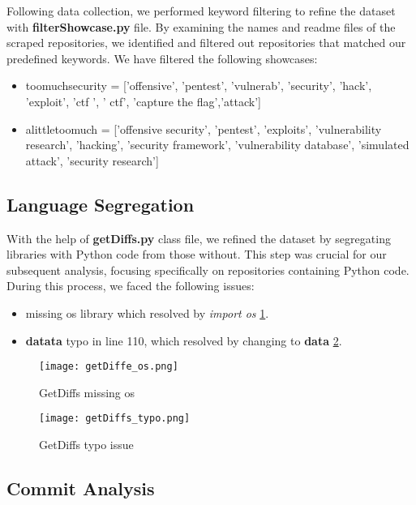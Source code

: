 Following data collection, we performed keyword filtering to refine the dataset with \textbf{filterShowcase.py} file. 
By examining the names and readme files of the scraped repositories, we identified and filtered out repositories that matched our predefined keywords.
We have filtered the following showcases:
\begin{itemize}
    \item toomuchsecurity = ['offensive', 'pentest', 'vulnerab', 'security', 'hack', 'exploit', 'ctf ', ' ctf', 'capture the flag','attack'] 
    \item alittletoomuch = ['offensive security', 'pentest', 'exploits', 'vulnerability research', 'hacking', 'security framework', 'vulnerability database', 'simulated attack', 'security research'] 
    \end{itemize}

\subsection{Language Segregation}

With the help of \textbf{getDiffs.py} class file, we refined the dataset by segregating libraries with Python code from those without. 
This step was crucial for our subsequent analysis, focusing specifically on repositories containing Python code.
During this process, we faced the following issues:

\begin{itemize}
    \item missing os library which resolved by \textit{import os} \ref{fig:diff_os}.
    \item \textbf{datata} typo in line 110, which resolved by changing to \textbf{data} \ref{fig:diff_typo}.
\end{itemize}

\begin{figure}
    \centering
    \texttt{[image: getDiffe\_os.png]}
    \caption{GetDiffs missing os}
    \label{fig:diff_os}
\end{figure}

\begin{figure}
    \centering
    \texttt{[image: getDiffs\_typo.png]}
    \caption{GetDiffs typo issue}
    \label{fig:diff_typo}
\end{figure}

\subsection{Commit Analysis}

